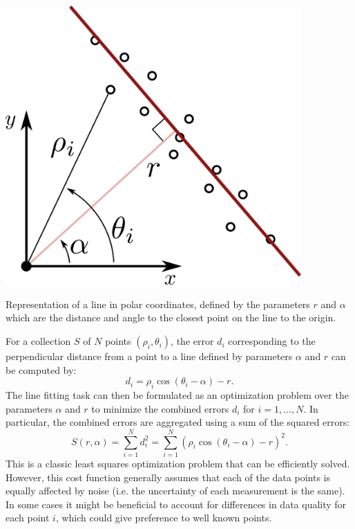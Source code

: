 \begin{marginfigure}
  \centering
  \includegraphics[width=0.85\textwidth]{tex/figs/ch11_figs/polarlinefit.png}
  \caption{Representation of a line in polar coordinates, defined by the parameters $r$ and $\alpha$ which are the distance and angle to the closest point on the line to the origin.}
  \label{fig:polarline}
\end{marginfigure}
For a collection $S$ of $N$ points $(\rho_i, \theta_i)$, the error $d_i$ corresponding to the perpendicular distance from a point to a line defined by parameters $\alpha$ and $r$ can be computed by:
\begin{equation} \label{eq:lineerror}
d_i = \rho_i \cos(\theta_i - \alpha) - r.
\end{equation}
The line fitting task can then be formulated as an optimization problem over the parameters $\alpha$ and $r$ to minimize the combined errors $d_i$ for $i = 1,\dots,N$. In particular, the combined errors are aggregated using a sum of the squared errors:
\begin{equation}
    S(r,\alpha) = \sum_{i=1}^N d_i^2 = \sum_{i=1}^N(\rho_i \cos(\theta_i - \alpha) - r)^2.
    \label{eq:MSL}
\end{equation}
This is a classic least squares optimization problem that can be efficiently solved. However, this cost function generally assumes that each of the data points is equally affected by noise (i.e. the uncertainty of each measurement is the same). In some cases it might be beneficial to account for differences in data quality for each point $i$, which could give preference to well known points.


